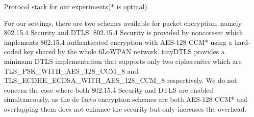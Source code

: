 \begin{table}[!h]
	\centering
	
	\caption{Protocol stack for our experiments(* is optinal)\label{Protocols}}
\end{table}


For our settings, there are two schemes available for packet encryption, namely 802.15.4 Security\cite{802154} and DTLS\cite{rfc6347}. 802.15.4 Security is provided by noncoresec\cite{noncoresec} which implements 802.15.4 authenticated encryption with AES-128 CCM*\cite{CCM} using a hard-coded key shared by the whole 6LoWPAN network. tinyDTLS\cite{tinydtls} provides a minimum DTLS implementation that supports only two ciphersuites which are TLS\_PSK\_WITH\_AES\_128\_CCM\_8\cite{rfc6655} and TLS\_ECDHE\_ECDSA\_WITH\_AES\_128\_CCM\_8\cite{rfc6655} respectively. We do not concern the case where both 802.15.4 Security and DTLS are enabled simultaneously, as the de facto encryption schemes are both AES-128 CCM* and overlapping them does not enhance the security but only increases the overhead.